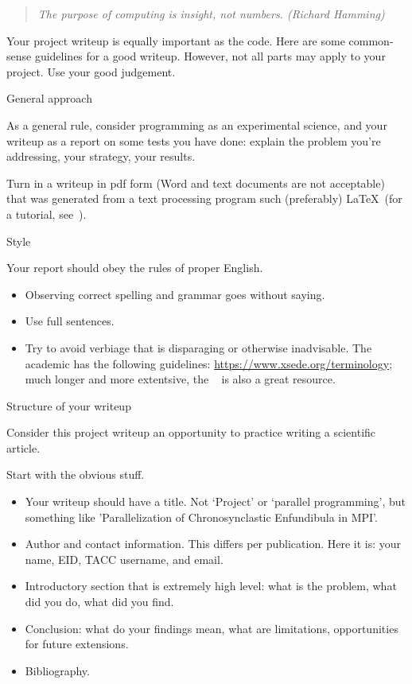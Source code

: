 
\begin{quote}
  \textsl{The purpose of computing is insight, not numbers. (Richard Hamming)}
\end{quote}

Your project writeup is equally important as the code.
Here are
some common-sense guidelines for a good writeup. However, not all
parts may apply to your project.
Use your good judgement.

 {General approach}

As a general rule, consider programming as an experimental science,
and your writeup as a report on some tests you have done: explain
the problem you're addressing, your strategy, your results.

Turn in a writeup in pdf form (Word and text documents are not acceptable)
that was generated from a text processing program such 
(preferably) \LaTeX\ (for a tutorial, see~).

 {Style}

Your report should obey the rules of proper English.
\begin{itemize}
\item Observing correct spelling and grammar goes without saying.
\item Use full sentences.
\item Try to avoid verbiage that is disparaging
  or otherwise inadvisable.
  The academic  has the following guidelines:
  \url{https://www.xsede.org/terminology};
  much longer and more extentsive, the
  ~\cite{googlestyle}
  is also a great resource.
\end{itemize}

 {Structure of your writeup}

Consider this project writeup an opportunity to practice writing a scientific article.

Start with the obvious stuff.
\begin{itemize}
\item Your writeup should have a title. Not `Project' or `parallel programming',
  but something like 'Parallelization of Chronosynclastic Enfundibula in MPI'.
\item Author and contact information. This differs per publication.
  Here it is: your name, EID, TACC username, and email.
\item Introductory section that is extremely high level: what is the problem,
  what did you do, what did you find.
\item Conclusion: what do your findings mean, what are limitations, opportunities
  for future extensions.
\item Bibliography.
\end{itemize}

